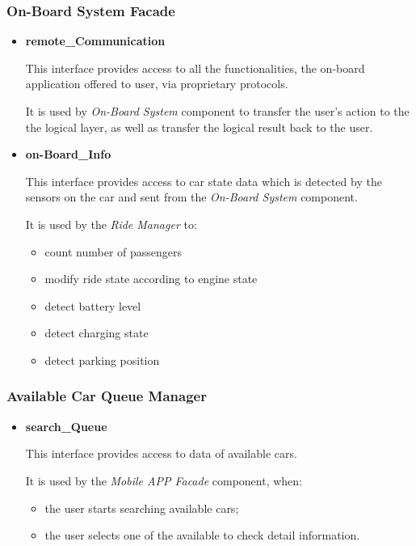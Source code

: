 \documentclass[a4paper,11pt]{article}
\begin{document}
		\subsubsection{On-Board System Facade}
			\begin{itemize}
				\item \textbf{remote\_Communication}

This interface provides access to all the functionalities, the on-board application offered to user, via proprietary protocols.

It is used by \textsl{On-Board System} component to transfer the user's action to the the logical layer, as well as transfer the logical result back to the user.
				
				\item \textbf{on-Board\_Info}

This interface provides access to car state data which is detected by the sensors on the car and sent from the \textsl{On-Board System} component. 

It is used by the \textsl{Ride Manager} to:
				\begin{itemize}
					\item count number of passengers
					\item modify ride state according to engine state
					\item detect battery level
					\item detect charging state
					\item detect parking position
				\end{itemize}
			\end{itemize}
			
		\subsubsection{Available Car Queue Manager}
			\begin{itemize}
				\item \textbf{search\_Queue}

This interface provides access to data of available cars.

It is used by the \textsl{Mobile APP Facade} component, when: 
					\begin{itemize}
						\item the user starts searching available cars; 
						\item the user selects one of the available to check detail information.
					\end{itemize}
			\end{itemize}
			
\end{document}
